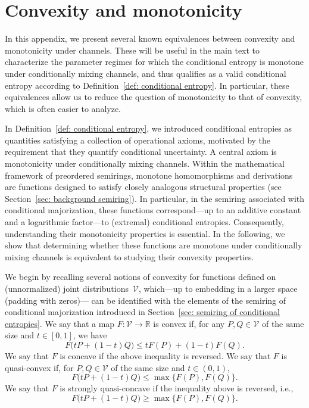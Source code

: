 \documentclass[aps,pra,11pt,onecolumn,nofootinbib,tightenlines]{revtex4-2}
\theoremstyle{definition}
\newcommand{\V}{\mathcal{V}}
\newcommand{\mb}[1]{\mathbb{#1}}
\begin{document}




\newpage
\appendix

\section{Convexity and monotonicity}
\label{app: convexity and monotonicity}
In this appendix, we present several known equivalences between convexity and monotonicity under channels. These will be useful in the main text to characterize the parameter regimes for which the conditional entropy is monotone under conditionally mixing channels, and thus qualifies as a valid conditional entropy according to Definition~\ref{def: conditional entropy}. In particular, these equivalences allow us to reduce the question of monotonicity to that of convexity, which is often easier to analyze.

In Definition~\ref{def: conditional entropy}, we introduced conditional entropies as quantities satisfying a collection of operational axioms, motivated by the requirement that they quantify conditional uncertainty. A central axiom is monotonicity under conditionally mixing channels.
Within the mathematical framework of preordered semirings, monotone homomorphisms and derivations are functions designed to satisfy closely analogous structural properties (see Section~\ref{sec: background semiring}). In particular, in the semiring associated with conditional majorization, these functions correspond—up to an additive constant and a logarithmic factor—to (extremal) conditional entropies.
Consequently, understanding their monotonicity properties is essential. In the following, we show that determining whether these functions are monotone under conditionally mixing channels is equivalent to studying their convexity properties.


We begin by recalling several notions of convexity for functions defined on
(unnormalized) joint distributions~$\mathcal V$, which—up to embedding in a larger space (padding with zeros)—
can be identified with the elements of the semiring of conditional majorization
introduced in Section~\ref{sec: semiring of conditional entropies}.
 We say that a map $F:\V\to\mb R$ is convex if, for any $P,Q\in\V$ of the same size and $t\in[0,1]$, we have
\begin{equation}
F\big(tP+(1-t)Q\big)\leq tF(P)+(1-t)F(Q).
\end{equation}
We say that $F$ is concave if the above inequality is reversed. We say that $F$ is quasi-convex if, for $P,Q\in\V$ of the same size and $t\in(0,1)$,
\begin{equation}
F\big(tP+(1-t)Q\big)\leq\max\{F(P),F(Q)\}.
\end{equation}
We say that $F$ is strongly quasi-concave if the inequality above is reversed, i.e.,
\begin{equation}
\label{eq: def strongly quasi-conc}
    F\big(tP+(1-t)Q\big)\geq\max\{F(P),F(Q)\}.
\end{equation}
\end{document}
